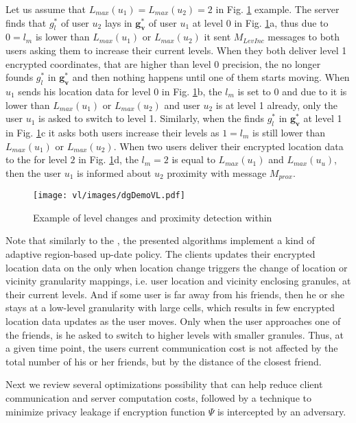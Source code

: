 Let us assume that $L_{max}(u_1) = L_{max}(u_2) = 2$ in Fig. \ref{fig:VLdemo}
example. The server finds that $g^*_l$ of user $u_2$ lays in $\mathbf{g^*_v}$
of user $u_1$ at level 0 in Fig. \ref{fig:VLdemo}a, thus due to $0 = l_m$ is
lower than $L_{max}(u_1)$ or $L_{max}(u_2)$ it sent $M_{LevInc}$ messages to
both users asking them to increase their current levels. When they both deliver
level 1 encrypted coordinates, that are higher than level 0 precision, the \ls
no longer founds $g^*_l$ in $\mathbf{g^*_v}$ and then nothing happens until one
of them starts moving. When $u_1$ sends his location data for level 0 in Fig.
\ref{fig:VLdemo}b, the $l_m$ is set to $0$ and due to it is lower than
$L_{max}(u_1)$ or $L_{max}(u_2)$ and user $u_2$ is at level 1 already, only
the user $u_1$ is asked to switch to level 1. Similarly, when the \ls finds
$g^*_l$ in $\mathbf{g^*_v}$ at level 1 in Fig. \ref{fig:VLdemo}c it asks both
users increase their levels as $1 = l_m$ is still lower than $L_{max}(u_1)$ or
$L_{max}(u_2)$. When two users deliver their encrypted location data to the \ls
for level $2$ in Fig. \ref{fig:VLdemo}d, the $l_m = 2$ is equal to
$L_{max}(u_1)$ and $L_{max}(u_u)$, then the user $u_1$ is informed about $u_2$
proximity with message $M_{prox}$.

\begin{figure}
       \center
        \texttt{[image: vl/images/dgDemoVL.pdf]}
        \caption{Example of level changes and proximity detection within \vl} 
       \label{fig:VLdemo}      
\end{figure}

Note that similarly to the \ff \cite{ffinder}, the presented algorithms
implement a kind of adaptive region-based up-date policy. The clients updates
their encrypted location data on the \ls only when location change triggers the
change of location or vicinity granularity mappings, i.e. user location and
vicinity enclosing granules, at their current levels. And if some user is far
away from his friends, then he or she stays at a low-level granularity with large
cells, which results in few encrypted location data updates as the user moves.
Only when the user approaches one of the friends, is he asked to switch to
higher levels with smaller granules. Thus, at a given time point, the users
current communication cost is not affected by the total number of his or her
friends, but by the distance of the closest friend. 

Next we review several optimizations possibility that can help reduce client
communication and server computation costs, followed by a technique to
minimize privacy leakage if encryption function $\Psi$ is intercepted by an
adversary.

